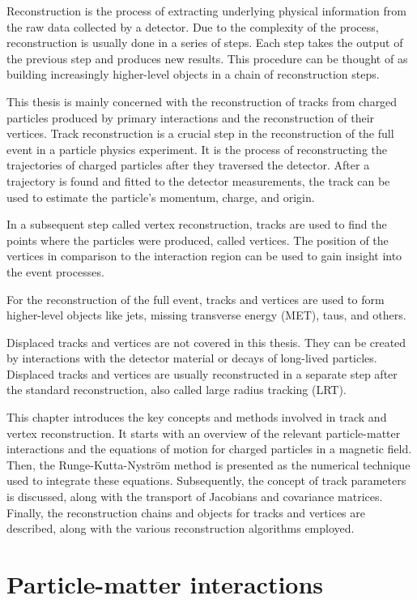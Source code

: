 Reconstruction is the process of extracting underlying physical information from the raw data collected by a detector. Due to the complexity of the process, reconstruction is usually done in a series of steps. Each step takes the output of the previous step and produces new results. This procedure can be thought of as building increasingly higher-level objects in a chain of reconstruction steps.

This thesis is mainly concerned with the reconstruction of tracks from charged particles produced by primary interactions and the reconstruction of their vertices. Track reconstruction is a crucial step in the reconstruction of the full event in a particle physics experiment. It is the process of reconstructing the trajectories of charged particles after they traversed the detector. After a trajectory is found and fitted to the detector measurements, the track can be used to estimate the particle's momentum, charge, and origin.

In a subsequent step called vertex reconstruction, tracks are used to find the points where the particles were produced, called vertices. The position of the vertices in comparison to the interaction region can be used to gain insight into the event processes.

For the reconstruction of the full event, tracks and vertices are used to form higher-level objects like jets, missing transverse energy (MET), taus, and others.

Displaced tracks and vertices are not covered in this thesis. They can be created by interactions with the detector material or decays of long-lived particles. Displaced tracks and vertices are usually reconstructed in a separate step after the standard reconstruction, also called large radius tracking (LRT).

This chapter introduces the key concepts and methods involved in track and vertex reconstruction. It starts with an overview of the relevant particle-matter interactions and the equations of motion for charged particles in a magnetic field. Then, the Runge-Kutta-Nyström method is presented as the numerical technique used to integrate these equations. Subsequently, the concept of track parameters is discussed, along with the transport of Jacobians and covariance matrices. Finally, the reconstruction chains and objects for tracks and vertices are described, along with the various reconstruction algorithms employed.

\section{Particle-matter interactions}

